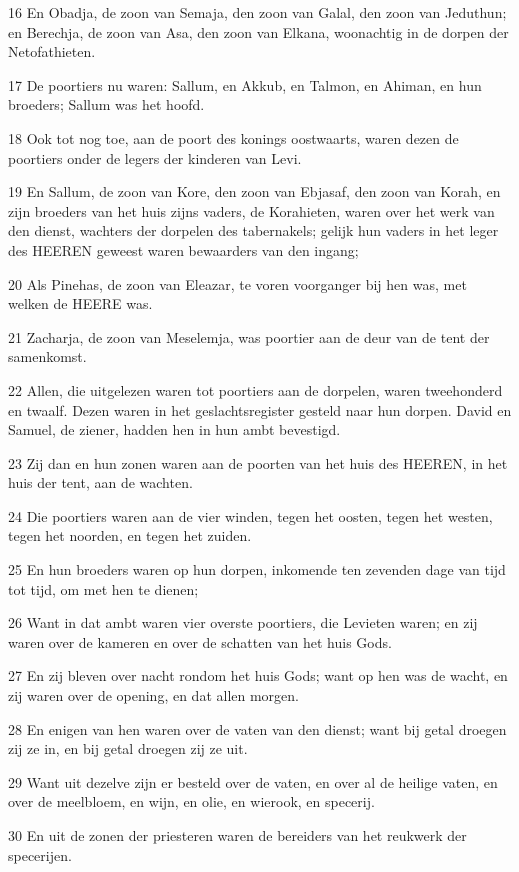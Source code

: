 \par 16 En Obadja, de zoon van Semaja, den zoon van Galal, den zoon van Jeduthun; en Berechja, de zoon van Asa, den zoon van Elkana, woonachtig in de dorpen der Netofathieten.
\par 17 De poortiers nu waren: Sallum, en Akkub, en Talmon, en Ahiman, en hun broeders; Sallum was het hoofd.
\par 18 Ook tot nog toe, aan de poort des konings oostwaarts, waren dezen de poortiers onder de legers der kinderen van Levi.
\par 19 En Sallum, de zoon van Kore, den zoon van Ebjasaf, den zoon van Korah, en zijn broeders van het huis zijns vaders, de Korahieten, waren over het werk van den dienst, wachters der dorpelen des tabernakels; gelijk hun vaders in het leger des HEEREN geweest waren bewaarders van den ingang;
\par 20 Als Pinehas, de zoon van Eleazar, te voren voorganger bij hen was, met welken de HEERE was.
\par 21 Zacharja, de zoon van Meselemja, was poortier aan de deur van de tent der samenkomst.
\par 22 Allen, die uitgelezen waren tot poortiers aan de dorpelen, waren tweehonderd en twaalf. Dezen waren in het geslachtsregister gesteld naar hun dorpen. David en Samuel, de ziener, hadden hen in hun ambt bevestigd.
\par 23 Zij dan en hun zonen waren aan de poorten van het huis des HEEREN, in het huis der tent, aan de wachten.
\par 24 Die poortiers waren aan de vier winden, tegen het oosten, tegen het westen, tegen het noorden, en tegen het zuiden.
\par 25 En hun broeders waren op hun dorpen, inkomende ten zevenden dage van tijd tot tijd, om met hen te dienen;
\par 26 Want in dat ambt waren vier overste poortiers, die Levieten waren; en zij waren over de kameren en over de schatten van het huis Gods.
\par 27 En zij bleven over nacht rondom het huis Gods; want op hen was de wacht, en zij waren over de opening, en dat allen morgen.
\par 28 En enigen van hen waren over de vaten van den dienst; want bij getal droegen zij ze in, en bij getal droegen zij ze uit.
\par 29 Want uit dezelve zijn er besteld over de vaten, en over al de heilige vaten, en over de meelbloem, en wijn, en olie, en wierook, en specerij.
\par 30 En uit de zonen der priesteren waren de bereiders van het reukwerk der specerijen.

